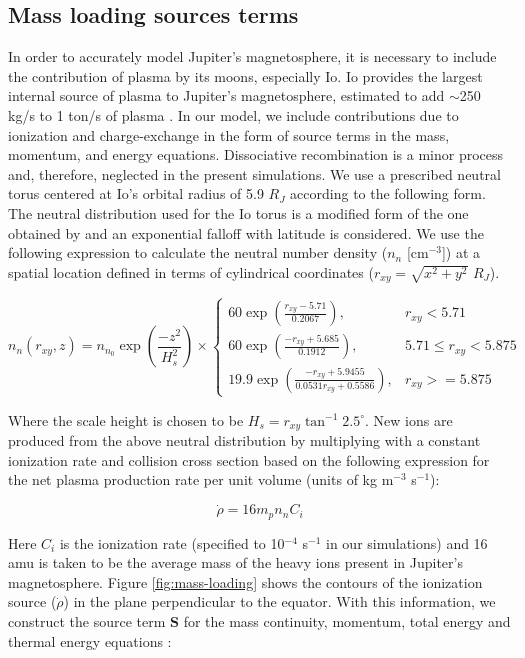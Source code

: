 \subsection{Mass loading sources terms}
In order to accurately model Jupiter's magnetosphere, it is necessary to include the contribution of plasma by its moons, especially Io. Io provides the largest internal source of plasma to Jupiter's magnetosphere, estimated to add $\sim$250 kg/s to 1 ton/s of plasma \cite{Bagenal2011b}. In our model, we include contributions due to ionization and charge‐exchange in the form of source terms in the mass, momentum, and energy equations. Dissociative recombination is a minor process and, therefore, neglected in the present simulations. We use a prescribed neutral torus centered at Io's orbital radius of 5.9 $R_J$ according to the following form. The neutral distribution used for the Io torus is a modified form of the one obtained by  and an exponential falloff with latitude is considered. We use the following expression to calculate the neutral number density ($n_n$ [cm$^{-3}$]) at a spatial location defined in terms of cylindrical coordinates ($r_{xy} = \sqrt{x^2 + y^2}$ $R_J$). 

\begin{equation}
    n_n \left(r_{xy}, z\right) = n_{n_0} \exp{\left(\frac{-z^2}{H_s^2}\right)}\times 
    \begin{cases}
        60 \exp\left( \frac{r_{xy} - 5.71}{0.2067}\right), & r_{xy} < 5.71\\
        60 \exp\left( \frac{-r_{xy} + 5.685}{0.1912}\right), &
        5.71 \leq r_{xy} < 5.875\\
        19.9 \exp\left( \frac{-r_{xy} + 5.9455}{0.0531 r_{xy} + 0.5586 }\right), &r_{xy} >= 5.875
    \end{cases}
\end{equation}

Where the scale height is chosen to be $H_s = r_{xy} \tan^{-1}2.5^\circ$. New ions are produced from the above neutral distribution by multiplying with a constant ionization rate and collision cross section based on the following expression for the net plasma production rate per unit volume (units of kg m$^{-3}$ s$^{-1}$):

\begin{equation}
    \dot{\rho} = 16 m_p n_n C_i
\end{equation}

Here $C_i$ is the ionization rate (specified to 10$^{-4}$ s$^{-1}$ in our simulations) and 16 amu is taken to be the average mass of the heavy ions present in Jupiter's magnetosphere. Figure \ref{fig:mass-loading} shows the contours of the ionization source ($\dot{\rho}$) in the plane perpendicular to the equator. With this information, we construct the source term $\mathbf{S}$ for the mass continuity, momentum, total energy and thermal energy equations \cite{Hansen2001a, Gombosi1996Three-dimensionalEnvironments}: 

